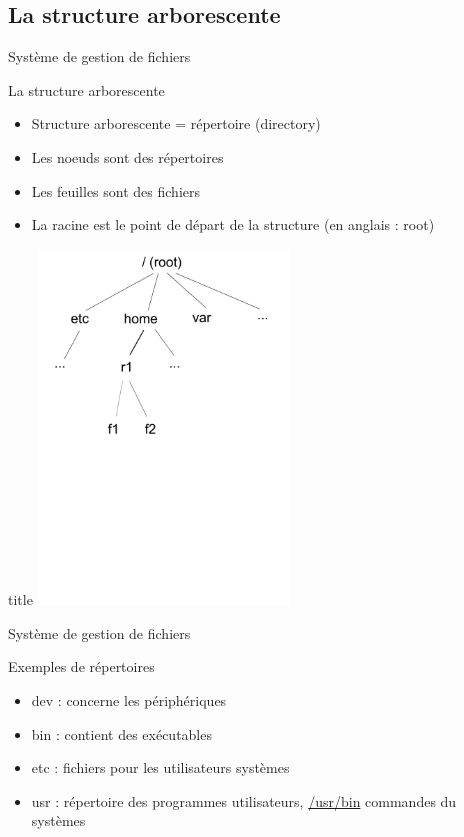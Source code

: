 \subsection{La structure arborescente}
\begin{frame}{Système de gestion de fichiers}
\begin{block}{La structure arborescente}
\begin{itemize}
\item Structure arborescente = répertoire (directory)
\item Les noeuds sont des répertoires
\item Les feuilles sont des fichiers
\item La racine est le point de départ de la structure (en anglais : root)
\end{itemize}
\end{block}

\begin{block}{title}
\includegraphics[width=0.5\textwidth]{images/arbo.pdf}
\end{block}

\end{frame}

\begin{frame}{Système de gestion de fichiers}
\begin{block}{Exemples de répertoires}
\begin{itemize}
\item dev : concerne les périphériques
\item bin : contient des exécutables
\item etc : fichiers pour les utilisateurs systèmes
\item usr : répertoire des programmes utilisateurs, \url{/usr/bin} commandes du systèmes
\end{itemize}
\end{block}

\end{frame}


